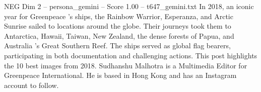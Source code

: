 \begin{textsample}{NEG Dim 2 – persona\_gemini – Score 1.00 – t647\_gemini.txt}  \label{ex:f2_neg_016}
In 2018, an iconic year for Greenpeace ’s ships, the Rainbow Warrior, Esperanza, and Arctic Sunrise sailed to locations around the globe.
Their journeys took them to Antarctica, Hawaii, Taiwan, New Zealand, the dense forests of Papua, and Australia 's Great Southern Reef.
The ships served as global flag bearers, participating in both documentation and challenging actions.
This post highlights the 10 best images from 2018.
Sudhanshu Malhotra is a Multimedia Editor for Greenpeace International.
He is based in Hong Kong and has an Instagram account to follow.

\end{textsample}
